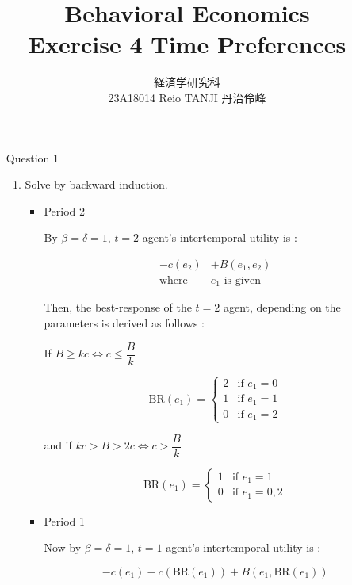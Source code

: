 \documentclass{jsarticle}
\begin{document}
\title{Behavioral Economics \\
Exercise 4 Time Preferences}
\author{経済学研究科　 \\ 23A18014 Reio TANJI 丹治伶峰}
\date{}
\maketitle

\begin{enumerate}

\item [Question 1]

\begin{enumerate}

\item

Solve by backward induction.

\begin{itemize}

\item Period 2

By $\beta = \delta = 1$, $t=2$ agent's intertemporal utility is :

\begin{align*}
-c(e_2) & + B(e_1,e_2) \\
\text{where } &  e_1 \text{ is given}
\end{align*}

Then, the best-response of the $t=2$ agent, depending on the parameters is derived as follows :

If $B \geq kc \Leftrightarrow c \leq \dfrac{B}{k}$

\[\text{BR}(e_1) = \begin{cases}
2 & \text{if } e_1=0 \\
1 & \text{if } e_1=1 \\
0 & \text{if } e_1=2
\end{cases} \]

and if $kc > B > 2c \Leftrightarrow c>\dfrac{B}{k}$

\[\text{BR}(e_1) = \begin{cases}
1 & \text{if } e_1=1 \\
0 & \text{if } e_1=0, 2
\end{cases}\]

\item Period 1

Now by $\beta = \delta = 1$, $t=1$ agent's intertemporal utility is :

\[ -c(e_1) - c(\text{BR}(e_1)) + B( e_1, \text{BR}(e_1)) \]


\end{itemize}
\end{enumerate}
\end{enumerate}
\end{document}

